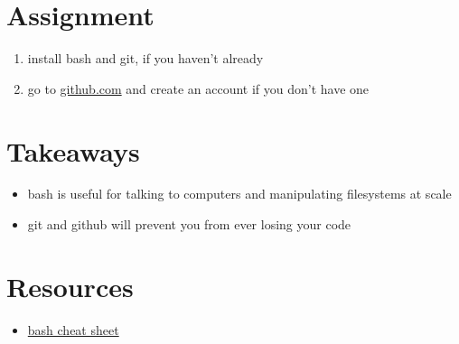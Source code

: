 \documentclass[
]{article}
\providecommand{\tightlist}{%
  \setlength{\itemsep}{0pt}\setlength{\parskip}{0pt}}
\begin{document}
\hypertarget{assignment}{%
\section{Assignment}\label{assignment}}

\begin{enumerate}
\def\labelenumi{\arabic{enumi}.}
\tightlist
\item
  install bash and git, if you haven't already
\item
  go to \href{https://github.com}{github.com} and create an account if
  you don't have one
\end{enumerate}

\hypertarget{takeaways}{%
\section{Takeaways}\label{takeaways}}

\begin{itemize}
\tightlist
\item
  bash is useful for talking to computers and manipulating filesystems
  at scale
\item
  git and github will prevent you from ever losing your code
\end{itemize}

\hypertarget{resources}{%
\section{Resources}\label{resources}}

\begin{itemize}
\tightlist
\item
  \href{https://oit.ua.edu/wp-content/uploads/2020/12/Linux_bash_cheat_sheet-1.pdf}{bash
  cheat sheet}
\end{itemize}

\printbibliography
\end{document}
